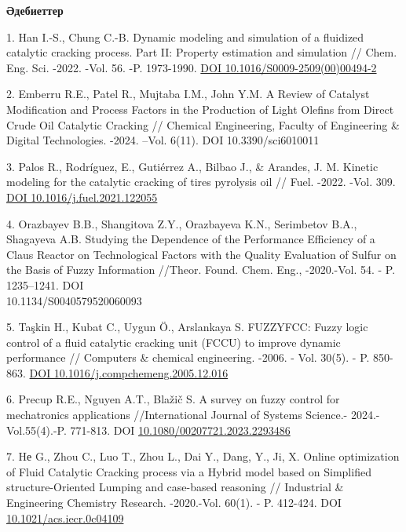 \begin{center}
{\bfseries Әдебиеттер}
\end{center}

\begin{references}

1. Han I.-S., Chung C.-B. Dynamic modeling and simulation of a fluidized
catalytic cracking process. Part II: Property estimation and
simulation // Chem. Eng. Sci. -2022. -Vol. 56. -P. 1973-1990.
\href{https://doi.org/10.1016/S0009-2509(00)00494-2}{DOI
10.1016/S0009-2509(00)00494-2}

2. Emberru R.E., Patel R., Mujtaba I.M., John Y.M. A Review of Catalyst
Modification and Process Factors in the Production of Light Olefins
from Direct Crude Oil Catalytic Cracking // Chemical Engineering,
Faculty of Engineering \& Digital Technologies. -2024. --Vol. 6(11).
DOI 10.3390/sci6010011

3. Palos R., Rodríguez, E., Gutiérrez A., Bilbao J., \& Arandes, J. M.
Kinetic modeling for the catalytic cracking of tires pyrolysis oil //
Fuel. -2022. -Vol. 309.
\href{https://doi.org/10.1016/j.fuel.2021.122055}{DOI
10.1016/j.fuel.2021.122055}

4. Orazbayev B.B., Shangitova Z.Y., Orazbayeva K.N., Serimbetov B.A.,
Shagayeva A.B. Studying the Dependence of the Performance Efficiency
of a Claus Reactor on Technological Factors with the Quality
Evaluation of Sulfur on the Basis of Fuzzy Information //Theor. Found.
Chem. Eng., -2020.-Vol. 54. - P. 1235--1241. DOI
\\10.1134/S0040579520060093

5. Taşkin H., Kubat C., Uygun Ö., Arslankaya S. FUZZYFCC: Fuzzy logic
control of a fluid catalytic cracking unit (FCCU) to improve dynamic
performance // Computers \& chemical engineering. -2006. - Vol. 30(5).
- P. 850-863. \href{https://doi.org/10.1016/j.compchemeng.2005.12.016}{DOI
10.1016/j.compchemeng.2005.12.016}

6. Precup R.E., Nguyen A.T., Blažič S. A survey on fuzzy control for
mechatronics applications //International Journal of Systems Science.-
2024.- Vol.55(4).-P. 771-813. DOI \href{https://doi.org/10.1080/00207721.2023.2293486}{10.1080/00207721.2023.2293486}


7. Hе G., Zhou C., Luo T., Zhou L., Dai Y., Dang, Y., Ji, X. Online
optimization of Fluid Catalytic Cracking process via a Hybrid model
based on Simplified structure-Oriented Lumping and case-based
reasoning // Industrial \& Engineering Chemistry Research. -2020.-Vol.
60(1). - P. 412-424. DOI
\href{http://dx.doi.org/10.1021/acs.iecr.0c04109}{10.1021/acs.iecr.0c04109}


\end{references}
